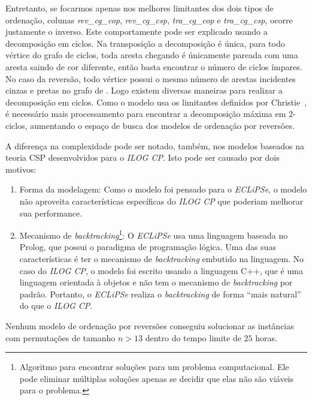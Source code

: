 Entretanto, se focarmos apenas nos melhores limitantes dos dois tipos de
ordenação, colunas \textit{rev\_cg\_cop}, \textit{rev\_cg\_csp},
\textit{tra\_cg\_cop} e \textit{tra\_cg\_csp}, ocorre justamente o
inverso. Este comportamente pode ser explicado usando a decomposição em
ciclos. Na transposição a decomposição é única, para todo vértice do
grafo de ciclos, toda aresta chegando é únicamente pareada com uma
aresta saindo de cor diferente, então basta encontrar o número de ciclos
ímpares. No caso da reversão, todo vértice possui o mesmo número de
arestas incidentes cinzas e pretas no grafo de \bkp{}. Logo existem
diversas maneiras para realizar a decomposição em ciclos. Como o modelo
usa os limitantes definidos por Christie~\cite{Christie*1998}, é
necessário mais processamento para encontrar a decomposição máxima em
$2$-ciclos, aumentando o espaço de busca dos modelos de ordenação por
reversões.

A diferença na complexidade pode ser notado, também, nos modelos
baseados na teoria CSP desenvolvidos para o \textit{ILOG CP}. Isto pode
ser causado por dois motivos:
\begin{enumerate}

    \item{Forma da modelagem: Como o modelo foi pensado para o
        \textit{ECLiPSe}, o modelo não aproveita características
        específicas do \textit{ILOG CP} que poderiam melhorar sua
        performance.}

    \item{Mecanismo de \textit{backtracking}\footnote{Algoritmo para
        encontrar soluções para um problema computacional. Ele pode
        eliminar múltiplas soluções apenas se decidir que elas não são
        viáveis para o problema.}: O \textit{ECLiPSe} usa uma linguagem 
        baseada no Prolog, que possui o paradigma de programação 
        lógica. Uma das suas características é ter o mecanismo de 
        \textit{backtracking} embutido na linguagem. No caso do 
        \textit{ILOG CP}, o modelo foi escrito usando a linguagem C++, 
        que é uma linguagem orientada à objetos e não tem o mecanismo 
        de \textit{backtracking} por padrão. Portanto, o 
        \textit{ECLiPSe} realiza o \textit{backtracking} de forma 
        ``mais natural'' do que o \textit{ILOG CP}.}

\end{enumerate}

Nenhum modelo de ordenação por reversões conseguiu solucionar as
instâncias com permutações de tamanho $n > 13$ dentro do tempo limite de
$25$ horas.

